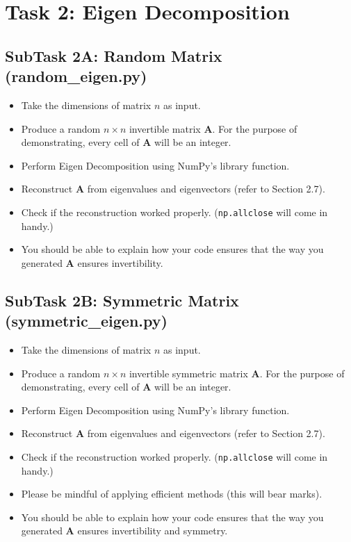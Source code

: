 \documentclass[11pt, a4paper]{article}
\begin{document}
\section{Task 2: Eigen Decomposition}

\subsection{SubTask 2A: Random Matrix (random\_eigen.py)}
\begin{itemize}
    \item Take the dimensions of matrix $n$ as input.
    \item Produce a random $n \times n$ invertible matrix $\mathbf{A}$. For the purpose of demonstrating, every cell of $\mathbf{A}$ will be an integer.
    \item Perform Eigen Decomposition using NumPy's library function.
    \item Reconstruct $\mathbf{A}$ from eigenvalues and eigenvectors (refer to Section 2.7).
    \item Check if the reconstruction worked properly. (\texttt{np.allclose} will come in handy.)
    \item You should be able to explain how your code ensures that the way you generated $\mathbf{A}$ ensures invertibility.
\end{itemize}

\subsection{SubTask 2B: Symmetric Matrix (symmetric\_eigen.py)}
\begin{itemize}
    \item Take the dimensions of matrix $n$ as input.
    \item Produce a random $n \times n$ invertible symmetric matrix $\mathbf{A}$. For the purpose of demonstrating, every cell of $\mathbf{A}$ will be an integer.
    \item Perform Eigen Decomposition using NumPy's library function.
    \item Reconstruct $\mathbf{A}$ from eigenvalues and eigenvectors (refer to Section 2.7).
    \item Check if the reconstruction worked properly. (\texttt{np.allclose} will come in handy.)
    \item Please be mindful of applying efficient methods (this will bear marks).
    \item You should be able to explain how your code ensures that the way you generated $\mathbf{A}$ ensures invertibility and symmetry.
\end{itemize}
\end{document}

